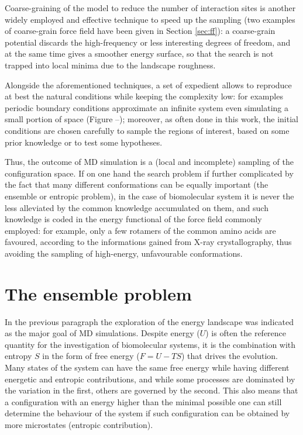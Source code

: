 Coarse-graining of the model to reduce the number of interaction sites is another widely employed and effective technique to speed up the sampling (two examples of coarse-grain force field have been given in Section \ref{sec:ff}): a coarse-grain potential discards the high-frequency or less interesting degrees of freedom, and at the same time gives a smoother energy surface, so that the search is not trapped into local minima due to the landscape roughness.

Alongside the aforementioned techniques, a set of expedient allows to reproduce at best the natural conditions while keeping the complexity low:
%
for examples periodic boundary conditions approximate an infinite system even simulating a small portion of space (Figure --); moreover, as often done in this work, the initial conditions are chosen carefully to sample the regions of interest, based on some prior knowledge or to test some hypotheses.

Thus, the outcome of MD simulation is a (local and incomplete) sampling of the configuration space.
%
If on one hand the search problem if further complicated by the fact that many different conformations can be equally important (the ensemble or entropic problem), in the case of biomolecular system it is never the less alleviated by the common knowledge accumulated on them, and such knowledge is coded in the energy functional of the force field commonly employed: for example, only a few rotamers of the common amino acids are favoured, according to the informations gained from X-ray crystallography, thus avoiding the sampling of high-energy, unfavourable conformations.


\section{The ensemble problem}

In the previous paragraph the exploration of the energy landscape was indicated as the major goal of MD simulations. Despite energy ($U$) is often the reference quantity for the investigation of biomolecular systems, it is the combination with entropy $S$ in the form of free energy ($F = U - TS$) that drives the evolution. Many states of the system can have the same free energy while having different energetic and entropic contributions, and while some processes are dominated by the variation in the first, others are governed by the second.
%
This also means that a configuration with an energy higher than the minimal possible one can still determine the behaviour of the system if such configuration can be obtained by more microstates (entropic contribution).

